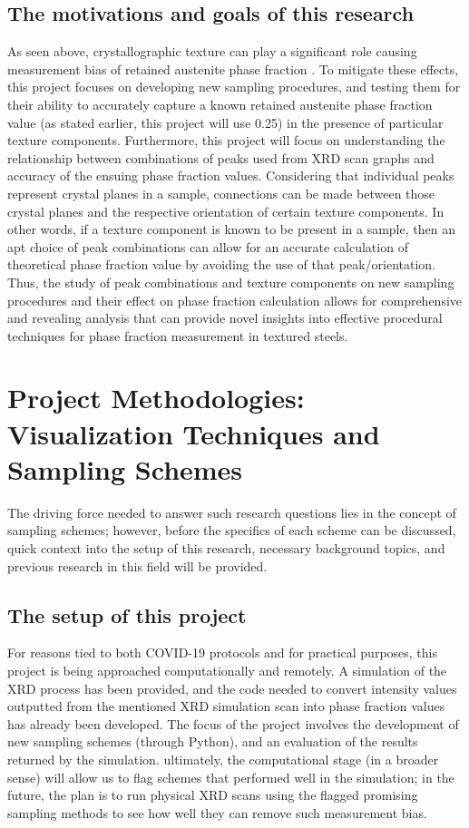 \documentclass[10pt]{article}
\begin{document}
\subsection{The motivations and goals of this research}
As seen above, crystallographic texture can play a significant role causing measurement bias of retained austenite phase fraction \cite{ref06}.
To mitigate these effects, this project focuses on developing new sampling procedures, and testing them for their ability to accurately
capture a known retained austenite phase fraction value (as stated earlier, this project will use 0.25) in the presence of particular texture components.
Furthermore, this project will focus on understanding the relationship between combinations of peaks used from XRD scan graphs and accuracy of the ensuing
phase fraction values. Considering that individual peaks represent crystal planes in a sample, connections can be made between those crystal planes
and the respective orientation of certain texture components. In other words, if a texture component is known to be present in a sample, then an apt choice
of peak combinations can allow for an accurate calculation of theoretical phase fraction value by avoiding the use of that peak/orientation. Thus, the study of peak combinations and texture 
components on new sampling procedures and their effect on phase fraction calculation allows for comprehensive and revealing analysis that can provide
novel insights into effective procedural techniques for phase fraction measurement in textured steels.

\section{Project Methodologies: Visualization Techniques and Sampling Schemes}

The driving force needed to answer such research questions lies in the concept of sampling schemes; however, before the specifics of each scheme can be discussed, 
quick context into the setup of this research, necessary background topics, and previous research in this field will be provided.

\subsection{The setup of this project}
For reasons tied to both COVID-19 protocols and for practical purposes, this project is being approached computationally and remotely.
A simulation of the XRD process has been provided, and the code needed to convert intensity values outputted from the mentioned XRD simulation scan into phase fraction values has already been developed. 
The focus of the project involves the development of new sampling schemes (through Python), and an evaluation of the results returned by the simulation. ultimately, the computational stage 
(in a broader sense) will allow us to flag schemes that performed well in the simulation; in the future, the plan is to run physical XRD scans using the flagged promising sampling methods to see how well 
they can remove such measurement bias.
\end{document}
